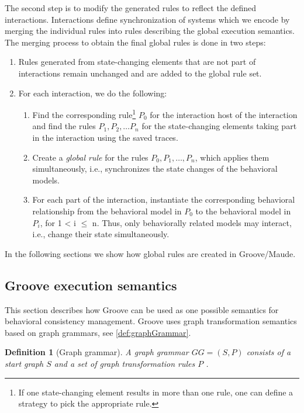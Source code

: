\documentclass{jot}
\newtheorem{definition}{Definition}
\begin{document}
The second step is to modify the generated rules to reflect the defined interactions.
Interactions define synchronization of systems which we encode by merging the individual rules into rules describing the global execution semantics.
The merging process to obtain the final global rules is done in two steps:

\begin{enumerate}
    \item Rules generated from state-changing elements that are not part of interactions remain unchanged and are added to the global rule set.
    \item For each interaction, we do the following:
     \begin{enumerate}
         \item Find the corresponding rule\footnote{If one state-changing element results in more than one rule, one can define a strategy to pick the appropriate rule.} $P_0$ for the interaction host of the interaction and find the rules $P_1, P_2, \ldots P_n$ for the state-changing elements taking part in the interaction using the saved traces.
         \item Create a \textit{global rule} for the rules $P_0, P_1, \ldots, P_n$, which applies them simultaneously, i.e., synchronizes the state changes of the behavioral models.
         \item For each part of the interaction, instantiate the corresponding behavioral relationship from the behavioral model in $P_0$ to the behavioral model in $P_i$, for 1 < i $\leq$ n.
         Thus, only behaviorally related models may interact, i.e., change their state simultaneously.
     \end{enumerate}
\end{enumerate}

In the following sections we show how global rules are created in Groove/Maude.

\subsection{Groove execution semantics} 
This section describes how Groove can be used as one possible semantics for behavioral consistency management.
Groove uses graph transformation semantics based on graph grammars, see \autoref{def:graphGrammar}.

\begin{definition}[Graph grammar] \label{def:graphGrammar}
A graph grammar $GG=(S, P)$ consists of a start graph $S$ and a set of graph transformation rules $P$ \cite{ehrigFundamentalsAlgebraicGraph2006}. 
\end{definition}
\end{document}
